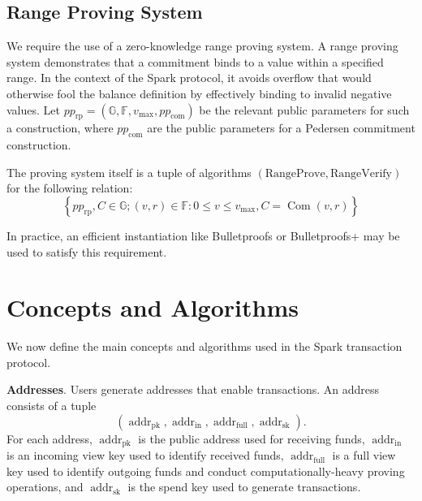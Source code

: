 \documentclass{llncs}
\newcommand{\G}{\mathbb{G}}
\newcommand{\F}{\mathbb{F}}
\newcommand{\addr}{\operatorname{addr}}
\newcommand{\com}{\operatorname{Com}}
\begin{document}
\subsection{Range Proving System}

We require the use of a zero-knowledge range proving system.
A range proving system demonstrates that a commitment binds to a value within a specified range.
In the context of the Spark protocol, it avoids overflow that would otherwise fool the balance definition by effectively binding to invalid negative values.
Let $pp_{\text{rp}} = (\G, \F, v_{\text{max}}, pp_{\text{com}})$ be the relevant public parameters for such a construction, where $pp_{\text{com}}$ are the public parameters for a Pedersen commitment construction.

The proving system itself is a tuple of algorithms $(\text{RangeProve},\text{RangeVerify})$ for the following relation:
$$\left\{ pp_{\text{rp}}, C \in \G ; (v, r) \in \F : 0 \leq v \leq v_{\text{max}}, C = \com(v,r) \right\}$$

In practice, an efficient instantiation like Bulletproofs \cite{bp} or Bulletproofs+ \cite{bp_plus} may be used to satisfy this requirement.


\section{Concepts and Algorithms}

We now define the main concepts and algorithms used in the Spark transaction protocol.

\textbf{Addresses}. Users generate addresses that enable transactions.
An address consists of a tuple $$(\addr_{\text{pk}}, \addr_{\text{in}}, \addr_{\text{full}}, \addr_{\text{sk}}).$$
For each address, $\addr_{\text{pk}}$ is the public address used for receiving funds, $\addr_{\text{in}}$ is an incoming view key used to identify received funds, $\addr_{\text{full}}$ is a full view key used to identify outgoing funds and conduct computationally-heavy proving operations, and $\addr_{\text{sk}}$ is the spend key used to generate transactions.
\end{document}

